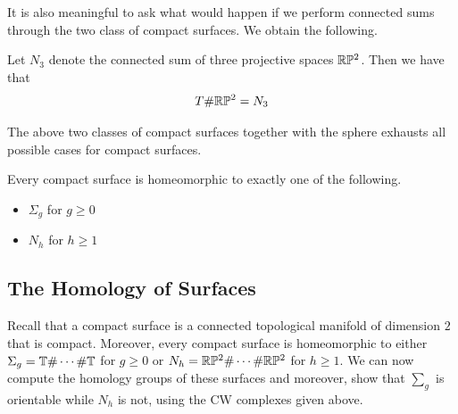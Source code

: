 \documentclass[a4paper]{article}
\begin{document}
It is also meaningful to ask what would happen if we perform connected sums through the two class of compact surfaces. We obtain the following. 

\begin{prp}{}{} Let $N_3$ denote the connected sum of three projective spaces $\mathbb{R}\mathbb{P}^2$. Then we have that $$T\#\mathbb{R}\mathbb{P}^2=N_3$$ 
\end{prp}

The above two classes of compact surfaces together with the sphere exhausts all possible cases for compact surfaces. 

\begin{thm}{}{} Every compact surface is homeomorphic to exactly one of the following. 
\begin{itemize}
\item $\Sigma_g$ for $g\geq 0$
\item $N_h$ for $h\geq 1$
\end{itemize}
\end{thm}

\subsection{The Homology of Surfaces}
Recall that a compact surface is a connected topological manifold of dimension $2$ that is compact. Moreover, every compact surface is homeomorphic to either $\Sigma_g=\mathbb{T}\#\cdots\#\mathbb{T}$ for $g\geq 0$ or $N_h=\mathbb{R}\mathbb{P}^2\#\cdots\#\mathbb{R}\mathbb{P}^2$ for $h\geq 1$. We can now compute the homology groups of these surfaces and moreover, show that $\sum_g$ is orientable while $N_h$ is not, using the CW complexes given above. 
\end{document}
